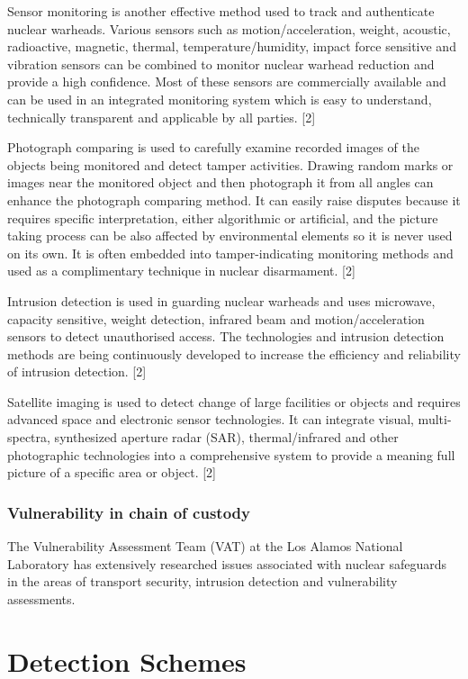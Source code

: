 \documentclass[a4paper]{article}
\begin{document}
Sensor monitoring is another effective method used to track and authenticate nuclear warheads.
Various sensors such as motion/acceleration, weight, acoustic, radioactive, magnetic, thermal,
temperature/humidity, impact force sensitive and vibration sensors can be combined to monitor
nuclear warhead reduction and provide a high confidence. Most of these sensors are commercially
available and can be used in an integrated monitoring system which is easy to understand,
technically transparent and applicable by all parties. [2]

Photograph comparing is used to carefully examine recorded images of the objects being monitored
and detect tamper activities. Drawing random marks or images near the monitored object and then
photograph it from all angles can enhance the photograph comparing method. It can easily raise
disputes because it requires specific interpretation, either algorithmic or artificial, and the picture
taking process can be also affected by environmental elements so it is never used on its own. It is
often embedded into tamper-indicating monitoring methods and used as a complimentary
technique in nuclear disarmament. [2]

Intrusion detection is used in guarding nuclear warheads and uses microwave, capacity sensitive,
weight detection, infrared beam and motion/acceleration sensors to detect unauthorised access.
The technologies and intrusion detection methods are being continuously developed to increase the
efficiency and reliability of intrusion detection. [2]

Satellite imaging is used to detect change of large facilities or objects and requires advanced space
and electronic sensor technologies. It can integrate visual, multi-spectra, synthesized aperture radar
(SAR), thermal/infrared and other photographic technologies into a comprehensive system to
provide a meaning full picture of a specific area or object. [2]

\subsubsection{Vulnerability in chain of custody}
The Vulnerability Assessment Team (VAT) at the Los Alamos National Laboratory has extensively
researched issues associated with nuclear safeguards in the areas of transport security, intrusion
detection and vulnerability assessments.

\section{Detection Schemes}
\end{document}
